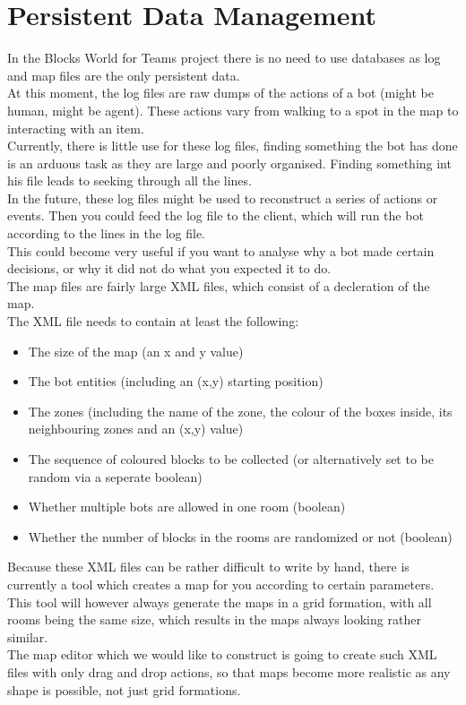 \section{Persistent Data Management}
In the Blocks World for Teams project there is no need to use databases as log and map files are the only persistent data.\\

At this moment, the log files are raw dumps of the actions of a bot (might be human, might be agent). These actions vary from walking to a spot in the map to interacting with an item. \\
Currently, there is little use for these log files, finding something the bot has done is an arduous task as they are large and poorly organised. Finding something int his file leads to seeking through all the lines. \\
In the future, these log files might be used to reconstruct a series of actions or events. Then you could feed the log file to the client, which will run the bot according to the lines in the log file. \\
This could become very useful if you want to analyse why a bot made certain decisions, or why it did not do what you expected it to do. \\

The map files are fairly large XML files, which consist of a decleration of the map. \\
The XML file needs to contain at least the following:
\begin{itemize}
\item The size of the map (an x and y value)
\item The bot entities (including an (x,y) starting position)
\item The zones (including the name of the zone, the colour of the boxes inside, its neighbouring zones and an (x,y) value)
\item The sequence of coloured blocks to be collected (or alternatively set to be random via a seperate boolean)
\item Whether multiple bots are allowed in one room (boolean)
\item Whether the number of blocks in the rooms are randomized or not (boolean)
\end{itemize}

Because these XML files can be rather difficult to write by hand, there is currently a tool which creates a map for you according to certain parameters. This tool will however always generate the maps in a grid formation, with all rooms being the same size, which results in the maps always looking rather similar. \\
The map editor which we would like to construct is going to create such XML files with only drag and drop actions, so that maps become more realistic as any shape is possible, not just grid formations.
